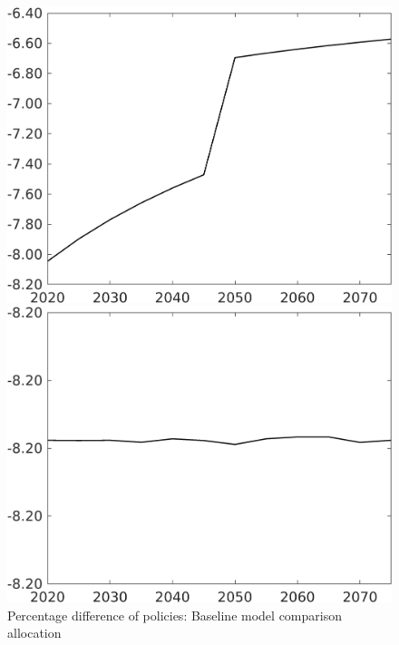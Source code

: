 \documentclass[12pt]{article}
\begin{document}
\begin{figure}[h!!]
	\centering
	\caption{Percentage difference of policies: Baseline model comparison allocation}\label{fig:Pertauf_nsk1_xgr0_notaul}
	\begin{minipage}[]{0.32\textwidth}
		\includegraphics[width=1\textwidth]{../../codding_model/own_basedOnFried/optimalPol_010922_revision/figures/all_13Sept22/CompTaufPER_bytaul_Reg0_tauf_spillover0_nsk1_xgr0_knspil0_sep0_LFlimit1_emsbase0_countec0_GovRev0_etaa0.79_lgd0.png}
	\end{minipage}		
	\begin{minipage}[]{0.32\textwidth}
		\includegraphics[width=1\textwidth]{../../codding_model/own_basedOnFried/optimalPol_010922_revision/figures/all_13Sept22/CompTaufPER_bytaul_Reg0_hh_spillover0_nsk1_xgr0_knspil0_sep0_LFlimit1_emsbase0_countec0_GovRev0_etaa0.79_lgd0.png}

\end{minipage}
\end{figure}
\end{document}
